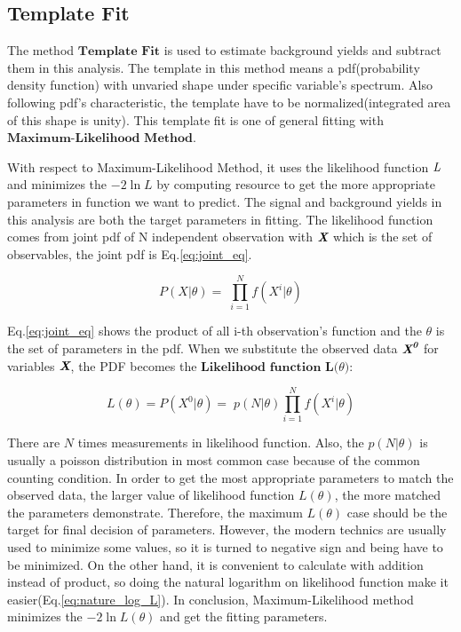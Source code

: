	\subsection{Template Fit}
	\label{ssec:TemplateFit}

		The method $\textbf{Template Fit}$ is used to estimate background yields and subtract them in this analysis. The template in this method means a pdf(probability density function) with unvaried shape under specific variable's spectrum. Also following pdf's characteristic, the template have to be normalized(integrated area of this shape is unity). This template fit is one of general fitting with $\textbf{Maximum-Likelihood Method}$. 

		With respect to Maximum-Likelihood Method, it uses the likelihood function $\emph{L}$ and minimizes the $-2\ln{L}$ by computing resource to get the more appropriate parameters in function we want to predict. The signal and background yields in this analysis are both the target parameters in fitting. The likelihood function comes from joint pdf of N independent observation with $\emph{\textbf{X}}$ which is the set of observables, the joint pdf is Eq.\ref{eq:joint_eq}. 

		\begin{equation}
		P(X|\theta) = 􏱛 \prod_{i=1}^{N} f(X^i|\theta)
		\label{eq:joint_eq}
		\end{equation}

		 Eq.\ref{eq:joint_eq} shows the product of all i-th observation's function and the $\theta$ is the set of parameters in the pdf. When we substitute the observed data $\emph{\textbf{X}}^{\emph{\textbf{0}}}$ for variables $\emph{\textbf{X}}$, the PDF becomes the $\textbf{Likelihood function L(} \theta \textbf{)}$:

		\begin{equation}
		L(\theta) = P(X^0|\theta) = 􏱛p(N|\theta) \prod_{i=1}^{N} f(X^i|\theta)
		\label{eq:likelihood_fn}
		\end{equation}

		There are $N$ times measurements in likelihood function. Also, the $p(N|\theta)$ is usually a poisson distribution in most common case because of the common counting condition. In order to get the most appropriate parameters to match the observed data, the larger value of likelihood function $L(\theta)$, the more matched the parameters demonstrate. Therefore, the maximum $L(\theta)$ case should be the target for final decision of parameters. However, the modern technics are usually used to minimize some values, so it is turned to negative sign and being have to be minimized. On the other hand, it is convenient to calculate with addition instead of product, so doing the natural logarithm on likelihood function make it easier(Eq.\ref{eq:nature_log_L}). In conclusion, Maximum-Likelihood method minimizes the $-2\ln{L(\theta)}$ and get the fitting parameters.

